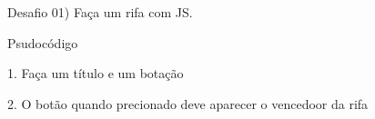 Desafio 01) Faça um rifa com JS.

Psudocódigo

1. Faça um título e um botação

2. O botão quando precionado deve aparecer o vencedoor da rifa
